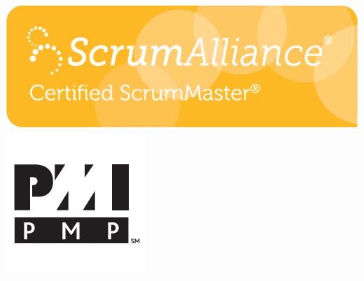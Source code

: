 \documentclass[a4paper,12pt]{article}
\begin{document}
\includegraphics[height=1.5\baselineskip]{agile}
\includegraphics[height=1.5\baselineskip]{pmp}
\end{document}
